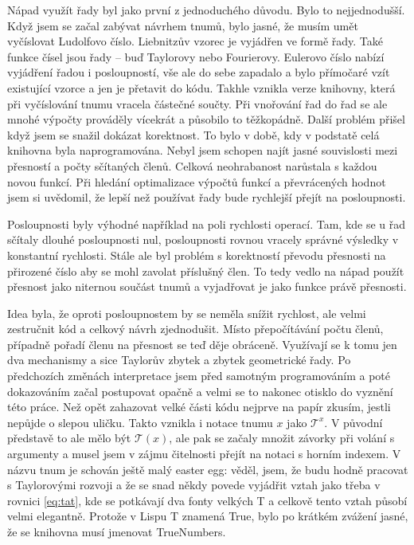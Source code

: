 Nápad využít řady byl jako první z jednoduchého důvodu. Bylo to nejjednodušší. Když jsem se začal zabývat návrhem tnumů, bylo jasné, že musím umět vyčíslovat Ludolfovo číslo. Liebnitzův vzorec je vyjádřen ve formě řady. Také funkce čísel jsou řady -- buď Taylorovy nebo Fourierovy. Eulerovo číslo nabízí vyjádření řadou i posloupností, vše ale do sebe zapadalo a bylo přímočaré vzít existující vzorce a jen je přetavit do kódu. Takhle vznikla verze knihovny, která při vyčíslování tnumu vracela částečné součty. Při vnořování řad do řad se ale mnohé výpočty prováděly vícekrát a působilo to těžkopádně. Další problém přišel když jsem se snažil dokázat korektnost. To bylo v době, kdy v podstatě celá knihovna byla naprogramována. Nebyl jsem schopen najít jasné souvislosti mezi přesností a počty sčítaných členů. Celková neohrabanost narůstala s každou novou funkcí. Při hledání optimalizace výpočtů funkcí a převrácených hodnot jsem si uvědomil, že lepší než používat řady bude rychlejší přejít na posloupnosti.

Posloupnosti byly výhodné například na poli rychlosti operací. Tam, kde se u řad sčítaly dlouhé posloupnosti nul, posloupnosti rovnou vracely správné výsledky v konstantní rychlosti. Stále ale byl problém s korektností převodu přesnosti na přirozené číslo aby se mohl zavolat příslušný člen. To tedy vedlo na nápad použít přesnost jako niternou součást tnumů a vyjadřovat je jako funkce právě přesnosti.

Idea byla, že oproti posloupnostem by se neměla snížit rychlost, ale velmi zestručnit kód a celkový návrh zjednodušit. Místo přepočítávání počtu členů, případně pořadí členu na přesnost se teď děje obráceně. Využívají se k tomu jen dva mechanismy a sice Taylorův zbytek a zbytek geometrické řady. Po předchozích změnách interpretace jsem před samotným programováním a poté dokazováním začal postupovat opačně a velmi se to nakonec otisklo do vyznění této práce. Než opět zahazovat velké části kódu nejprve na papír zkusím, jestli nepůjde o slepou uličku. Takto vznikla i notace tnumu $x$ jako $\mathcal{T}^x$. V původní představě to ale mělo být $\mathcal{T}(x)$, ale pak se začaly množit závorky při volání s argumenty a musel jsem v zájmu čitelnosti přejít na notaci s horním indexem. V názvu tnum je schován ještě malý easter egg: věděl, jsem, že budu hodně pracovat s Taylorovými rozvoji a že se snad někdy povede vyjádřit vztah jako třeba v rovnici \ref{eq:tat}, kde se potkávají dva fonty velkých T a celkově tento vztah působí velmi elegantně. Protože v Lispu T znamená True, bylo po krátkém zvážení jasné, že se knihovna musí jmenovat TrueNumbers.

